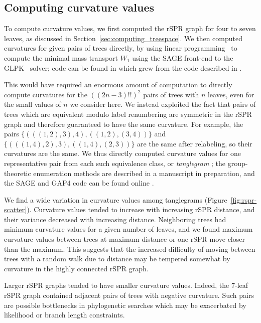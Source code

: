 \documentclass[11pt,onecolumn,conference]{IEEEtran}
\newcommand{\cuttable}[2][]{%
    \ifthenelse{\equal{#1}{}}%
		{}%
		{#1}%
}
\begin{document}
\subsection{Computing curvature values}
To compute curvature values, we first \cuttable[computed]{used \texttt{dense\_spr\_graph} to compute} the rSPR graph for four to seven leaves, as discussed in Section~\ref{sec:computing_treespace}.
We then computed curvatures for given pairs of trees directly, by using linear programming~\cite{Loisel2014-hu} to compute the minimal mass transport $W_1$ using the SAGE \cite{SAGE} front-end to the GLPK~\cite{glpk} solver; code can be found in \cite{gricci} which grew from the code described in \cite{Loisel2014-hu}.

This would have required an enormous amount of computation to directly compute curvatures for the $((2n-3)!!)^2$ pairs of trees with $n$ leaves, even for the small values of $n$ we consider here.
We instead exploited the fact that pairs of trees which are equivalent modulo label renumbering are symmetric in the rSPR graph and therefore guaranteed to have the same curvature.
For example, the pairs
$\{(((1,2),3),4), ((1,2),(3,4))\}$ and
$\{(((1,4),2),3), ((1,4),(2,3))\}$
are the same after relabeling, so their curvatures are the same.
We thus directly computed curvature values for one representative pair from each such equivalence class, or \emph{tanglegram} \cite{Venkatachalam2010-zh}; the group-theoretic enumeration methods are described in a manuscript in preparation, and the SAGE \cite{SAGE} and GAP4 \cite{GAP4} code can be found online \cite{tangle}.

We find a wide variation in curvature values among tanglegrams (Figure~\ref{fig:rspr-scatter}).
Curvature values tended to increase with increasing rSPR distance, and their variance decreased with increasing distance.
Neighboring trees had minimum curvature values for a given number of leaves, and we found maximum curvature values between trees at maximum distance or one rSPR move closer than the maximum.
This suggests that the increased difficulty of moving between trees with a random walk due to distance may be tempered somewhat by curvature in the highly connected rSPR graph.

Larger rSPR graphs tended to have smaller curvature values.
Indeed, the 7-leaf rSPR graph contained adjacent pairs of trees with negative curvature.
Such pairs are possible bottlenecks in phylogenetic searches which may be exacerbated by likelihood or branch length constraints.
\end{document}
